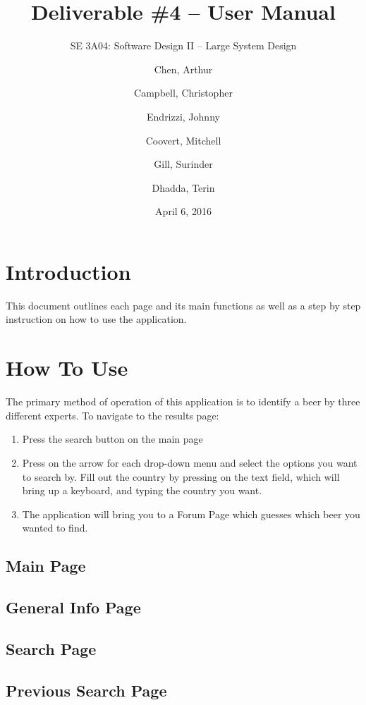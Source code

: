 \documentclass[]{article}
\title{Deliverable \#4 -- User Manual}
\author{SE 3A04: Software Design II -- Large System Design}
\author{Chen, Arthur \and Campbell, Christopher \and Endrizzi, Johnny \\ 
\and Coovert, Mitchell \and Gill, Surinder \and Dhadda, Terin}
\date {April 6, 2016}
\begin{document}
\maketitle	
\newpage
\tableofcontents
\listoffigures
\listoftables
\newpage

\section{Introduction}
\label{sec:introduction}
This document outlines each page and its main functions as well as a step by step instruction on how to use the application.

\section{How To Use}
The primary method of operation of this application is to identify a beer by three different experts. To navigate to the results page:
\begin{enumerate}
\item Press the search button on the main page
\item Press on the arrow for each drop-down menu and select the options you want to search by. Fill out the country by pressing on the text field, which will bring up a keyboard, and typing the country you want.
\item The application will bring you to a Forum Page which guesses which beer you wanted to find.
\end{enumerate}

\subsection{Main Page}

\subsection{General Info Page}

\subsection{Search Page}

\subsection{Previous Search Page}
\end{document}
